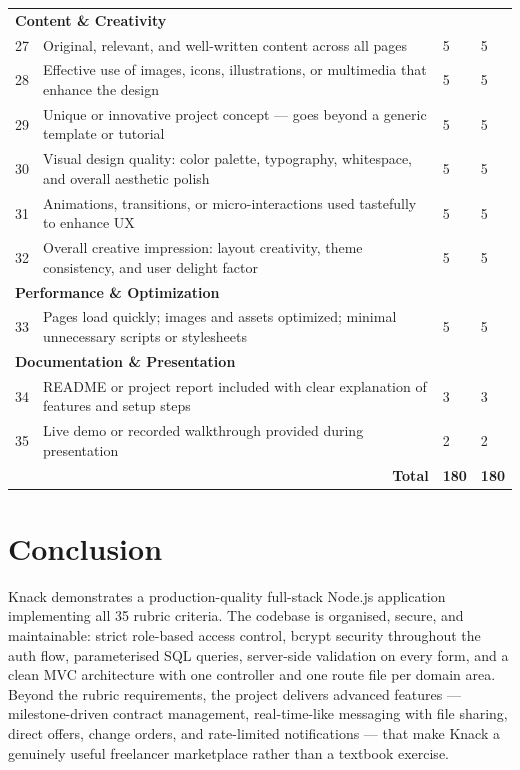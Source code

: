 \documentclass[12pt,a4paper]{article}
\begin{document}
\begin{longtable}{p{0.5cm} p{9cm} p{1.8cm} p{1.8cm}}
\multicolumn{4}{l}{\textbf{Content \& Creativity}} \\[4pt]
27 & Original, relevant, and well-written content across all pages & 5 & 5 \\[4pt]
28 & Effective use of images, icons, illustrations, or multimedia that enhance the design & 5 & 5 \\[4pt]
29 & Unique or innovative project concept --- goes beyond a generic template or tutorial & 5 & 5 \\[4pt]
30 & Visual design quality: color palette, typography, whitespace, and overall aesthetic polish & 5 & 5 \\[4pt]
31 & Animations, transitions, or micro-interactions used tastefully to enhance UX & 5 & 5 \\[4pt]
32 & Overall creative impression: layout creativity, theme consistency, and user delight factor & 5 & 5 \\[8pt]

\multicolumn{4}{l}{\textbf{Performance \& Optimization}} \\[4pt]
33 & Pages load quickly; images and assets optimized; minimal unnecessary scripts or stylesheets & 5 & 5 \\[8pt]

\multicolumn{4}{l}{\textbf{Documentation \& Presentation}} \\[4pt]
34 & README or project report included with clear explanation of features and setup steps & 3 & 3 \\[4pt]
35 & Live demo or recorded walkthrough provided during presentation & 2 & 2 \\[8pt]

\midrule
\multicolumn{2}{r}{\textbf{Total}} & \textbf{180} & \textbf{180} \\
\bottomrule
\end{longtable}

\section{Conclusion}

Knack demonstrates a production-quality full-stack Node.js application implementing all 35 rubric criteria. The codebase is organised, secure, and maintainable: strict role-based access control, bcrypt security throughout the auth flow, parameterised SQL queries, server-side validation on every form, and a clean MVC architecture with one controller and one route file per domain area. Beyond the rubric requirements, the project delivers advanced features --- milestone-driven contract management, real-time-like messaging with file sharing, direct offers, change orders, and rate-limited notifications --- that make Knack a genuinely useful freelancer marketplace rather than a textbook exercise.
\end{document}
